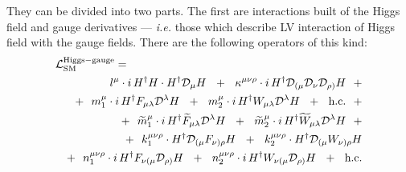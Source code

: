 \documentclass[12pt]{revtex4}
\newcommand{\wt}{\widetilde}
\newcommand{\md}{\mathcal{D}}
\begin{document}
	They can be divided into two parts. 
	The first are interactions built of the Higgs field and gauge 
	derivatives
	--- {\it i.e.} those which describe LV interaction of Higgs field with
	the gauge fields.
	There are the following operators of this kind:
\begin{eqnarray*}
\nonumber
\lefteqn{
	\mathcal{L}_{\rm SM}^{\rm Higgs-gauge} =
	}
	\\
\nonumber
	&&
	\phantom{+~~}
	l^\mu \cdot
	i\, 
	H^\dag H \cdot H^\dag \md_\mu H
	~~+~~
	\kappa^{\mu\nu\rho} \cdot
	i\, 
	H^\dag \md_{(\mu} \md_\nu \md_{\rho)} H
	~~+
	\\
\nonumber
	&&
	+~~
	m^\mu_1 \cdot
	i\, 
	H^\dag F_{\mu\lambda} \md^\lambda H
	~~+~~
	m^\mu_2 \cdot
	i\, 
	H^\dag W_{\mu\lambda} \md^\lambda H
	~~+~~
	\text{h.c.}
	~~+
	\\
\nonumber
	&&
	+~~
	\wt{m}^\mu_1 \cdot
	i\, 
	H^\dag \wt{F}_{\mu\lambda} \md^\lambda H
	~~+~~
	\wt{m}^\mu_2 \cdot
	i\, 
	H^\dag \wt{W}_{\mu\lambda} \md^\lambda H
	~~+
	\\
\nonumber
	&&
	+~~
	k^{\mu\nu\rho}_{1} \cdot
	H^\dag \md_{(\mu} F_{\nu)\rho} H
	~~+~~
	k^{\mu\nu\rho}_{2} \cdot
	H^\dag \md_{(\mu} W_{\nu)\rho} H
	\\
\nonumber
	&&
	+~~
	n^{\mu\nu\rho}_{1} \cdot
	i\, 
	H^\dag F_{\nu(\mu} \md_{\rho)} H
	~~+~~
	n^{\mu\nu\rho}_{2} \cdot
	i\, 
	H^\dag W_{\nu(\mu} \md_{\rho)}  H
	~~+~~
	\text{h.c.}
\end{eqnarray*}
\end{document}

